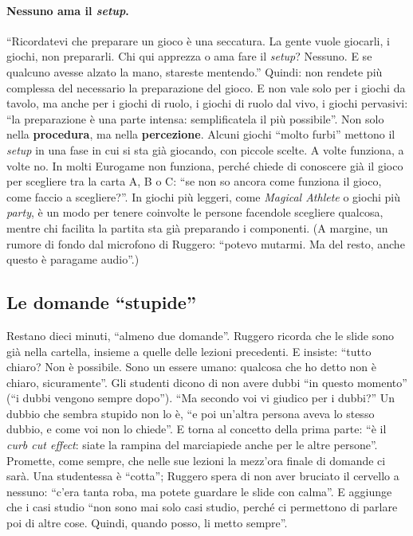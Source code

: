 \paragraph{Nessuno ama il \emph{setup}.} ``Ricordatevi che preparare un gioco è una
seccatura. La gente vuole giocarli, i giochi, non prepararli. Chi qui apprezza o ama fare
il \emph{setup}? Nessuno. E se qualcuno avesse alzato la mano, stareste mentendo.''
Quindi: non rendete più complessa del necessario la preparazione del gioco. E non vale
solo per i giochi da tavolo, ma anche per i giochi di ruolo, i giochi di ruolo dal vivo,
i giochi pervasivi: ``la preparazione è una parte intensa: semplificatela il più
possibile''. Non solo nella \textbf{procedura}, ma nella \textbf{percezione}. Alcuni
giochi ``molto furbi'' mettono il \emph{setup} in una fase in cui si sta già giocando,
con piccole scelte. A volte funziona, a volte no. In molti Eurogame non funziona, perché
chiede di conoscere già il gioco per scegliere tra la carta A, B o C: ``se non so ancora
come funziona il gioco, come faccio a scegliere?''. In giochi più leggeri, come
\emph{Magical Athlete} o giochi più \emph{party}, è un modo per tenere coinvolte le persone
facendole scegliere qualcosa, mentre chi facilita la partita sta già preparando i
componenti. (A margine, un rumore di fondo dal microfono di Ruggero: ``potevo mutarmi.
Ma del resto, anche questo è paragame audio''.)

\subsection{Le domande ``stupide''}

Restano dieci minuti, ``almeno due domande''. Ruggero ricorda che le slide sono già nella
cartella, insieme a quelle delle lezioni precedenti. E insiste: ``tutto chiaro? Non è
possibile. Sono un essere umano: qualcosa che ho detto non è chiaro, sicuramente''. Gli
studenti dicono di non avere dubbi ``in questo momento'' (``i dubbi vengono sempre
dopo''). ``Ma secondo voi vi giudico per i dubbi?'' Un dubbio che sembra stupido non lo
è, ``e poi un'altra persona aveva lo stesso dubbio, e come voi non lo chiede''. E torna al
concetto della prima parte: ``è il \emph{curb cut effect}: siate la rampina del
marciapiede anche per le altre persone''. Promette, come sempre, che nelle sue lezioni
la mezz'ora finale di domande ci sarà. Una studentessa è ``cotta''; Ruggero spera di non
aver bruciato il cervello a nessuno: ``c'era tanta roba, ma potete guardare le slide con
calma''. E aggiunge che i casi studio ``non sono mai solo casi studio, perché ci
permettono di parlare poi di altre cose. Quindi, quando posso, li metto sempre''.

